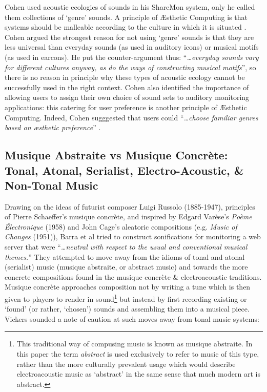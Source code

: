 \documentclass{article}
\begin{document}
Cohen \cite{Cohen:1994} used acoustic ecologies of sounds in his {\sc ShareMon} system, only he called them collections of `genre' sounds. A principle of Æsthetic Computing is that systems should be malleable according to the culture in which it is situated \cite{Fishwick:2002}. Cohen argued the strongest reason for not using `genre' sounds is that they are less universal than everyday sounds (as used in auditory icons) or musical motifs (as used in earcons). He put the counter-argument thus: ``\textit{\ldots everyday sounds vary for different cultures anyway, as do the ways of constructing musical motifs}'', so there is no reason in principle why these types of acoustic ecology cannot be successfully used in the right context. Cohen also identified the importance of allowing users to assign their own choice of sound sets to auditory monitoring applications: this catering for user preference is another principle of Æsthetic Computing.  Indeed, Cohen sugggested that users could ``\textit{\ldots choose familiar genres based on æsthetic preference}'' \cite{Cohen:1993}.
\subsection{Musique Abstraite vs Musique Concrète: Tonal, Atonal, Serialist, Electro-Acoustic, \& Non-Tonal Music}

Drawing on the ideas of futurist composer Luigi Russolo (1885-1947), principles of Pierre Schaeffer's musique concrète, and inspired by Edgard Varèse's \textit{Poème Électronique} (1958) and John Cage's aleatoric compositions (e.g. \textit{Music of Changes} (1951)), Barra et al \cite{Barra:2002} tried to construct sonifications for monitoring a web server that were ``\textit{…neutral with respect to the usual and conventional musical themes.}'' They attempted to move away from the idioms of tonal and atonal (serialist) music (musique abstraite, or abstract music) and towards the more concrete compositions found in the musique concrète \& electroacoustic traditions. Musique concrète approaches composition not by writing a tune which is then given to players to render in sound\footnote{This traditional way of compusing music is known as musique abstraite. In this paper the term \textit{abstract} is used exclusively to refer to music of this type, rather than the more culturally prevalent usage which would describe electroacoustic music as `abstract' in the same sense that much modern art is abstract.} but instead by first recording existing or `found' (or rather, `chosen') sounds and assembling them into a musical piece. Vickers \cite{Vickers:2004a} sounded a note of caution at such moves away from tonal music systems:
\end{document}
